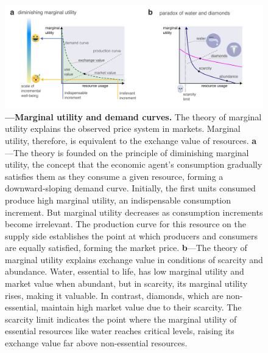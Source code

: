\documentclass[./main_en.tex]{subfiles}
\begin{document}
\begin{figure}[t!] 
\centering				
\includegraphics[width=0.98\linewidth]{figs/fig_marginalutil_en.jpg}		
\caption[Marginal Utility and Demand Curves]
{\textbf{---\;Marginal utility and demand curves.}
    The theory of marginal utility explains the observed price system in markets. Marginal utility, therefore, is equivalent to the exchange value of resources. 
    \;\textbf{a}\;---\;The theory is founded on the principle of diminishing marginal utility, the concept that the economic agent’s consumption gradually satisfies them as they consume a given resource, forming a downward-sloping demand curve. Initially, the first units consumed produce high marginal utility, an indispensable consumption increment. But marginal utility decreases as consumption increments become irrelevant. The production curve for this resource on the supply side establishes the point at which producers and consumers are equally satisfied, forming the market price.
    \;\textbf{b}\;---\;The theory of marginal utility explains exchange value in conditions of scarcity and abundance. Water, essential to life, has low marginal utility and market value when abundant, but in scarcity, its marginal utility rises, making it valuable. In contrast, diamonds, which are non-essential, maintain high market value due to their scarcity. The scarcity limit indicates the point where the marginal utility of essential resources like water reaches critical levels, raising its exchange value far above non-essential resources.
}
\label{fig:eco:marginutil} 		
\end{figure}
\end{document}
